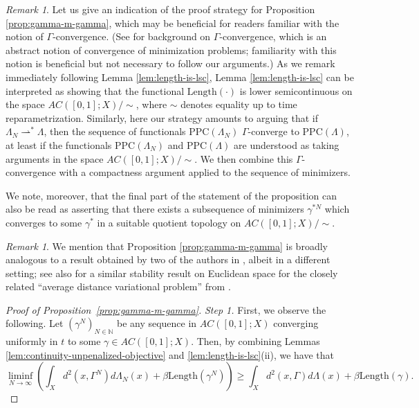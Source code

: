 \documentclass[aos, preprint]{imsart}
\theoremstyle{plain}
\theoremstyle{remark}
\newtheorem{rem}[example]{Remark}
\begin{document}
\begin{appendix}
\begin{rem}
  Let us give an indication of the proof strategy for Proposition \ref{prop:gamma-m-gamma}, which may be
  beneficial for readers familiar with the notion of
  $\Gamma$-convergence. (See \cite{braides2002gamma, degiorgi2013selected} for background on $\Gamma$-convergence, which is an abstract notion of convergence of minimization problems; familiarity with this notion is beneficial but not necessary to follow our arguments.)  As we remark immediately following Lemma
  \ref{lem:length-is-lsc}, Lemma \ref{lem:length-is-lsc} can be
  interpreted as showing that the functional $\text{Length}(\cdot)$ is
  lower semicontinuous on the space $AC([0,1];X)/\sim$, where $\sim$
  denotes equality up to time reparametrization. Similarly, here our
  strategy amounts to arguing that if $\Lambda_{N} \rightharpoonup^{*}
  \Lambda$, then the sequence of functionals $\text{PPC}(\Lambda_{N})$
  $\Gamma$-converge to $\text{PPC}(\Lambda)$, at least if the
  functionals $\text{PPC}(\Lambda_{N})$ and $\text{PPC}(\Lambda)$ are
  understood as taking arguments in the
  space $AC([0,1];X)/\sim$. We then combine this $\Gamma$-convergence
  with a compactness argument applied to the sequence of minimizers.

  We note, moreover, that the final part of the statement of the
  proposition can also be read as asserting that there exists a
  subsequence of minimizers $\gamma^{*N}$ which converges to some
  $\gamma^{*}$ in a suitable quotient topology on $AC([0,1];X)/\sim$.
\end{rem}

\begin{rem}
 We mention that
  Proposition \ref{prop:gamma-m-gamma} is broadly analogous to a result
  obtained by two of the authors in \cite[Cor.
 5.2]{kobayashi2024monge}, albeit in a different setting; see also
 \cite[Lem. 3]{slepvcev2014counterexample} for a similar stability
 result on Euclidean space for the closely related ``average distance
 variational problem'' from \cite{buttazzo2002adp}.
\end{rem}

\begin{proof}[Proof of Proposition~\ref{prop:gamma-m-gamma}]
  \emph{Step 1.} First, we observe the following. Let
  $(\gamma^{N})_{N\in\mathbb{N}}$ be any sequence in $AC([0,1];X)$
  converging uniformly in $t$ to some $\gamma\in AC([0,1];X)$. Then, by
  combining Lemmas \ref{lem:continuity-unpenalized-objective} and
  \ref{lem:length-is-lsc}(ii), we have that
  \[
    \liminf_{N\rightarrow\infty} \left( \int_{X}d^{2}(x,\Gamma^{N})
      d\Lambda_{N}(x) + \beta \text{Length}(\gamma^{N}) \right) \geq
    \int_{X} d^{2}(x,\Gamma) d\Lambda(x) + \beta \text{Length}(\gamma).
  \]


\end{proof}
\end{appendix}
\end{document}
